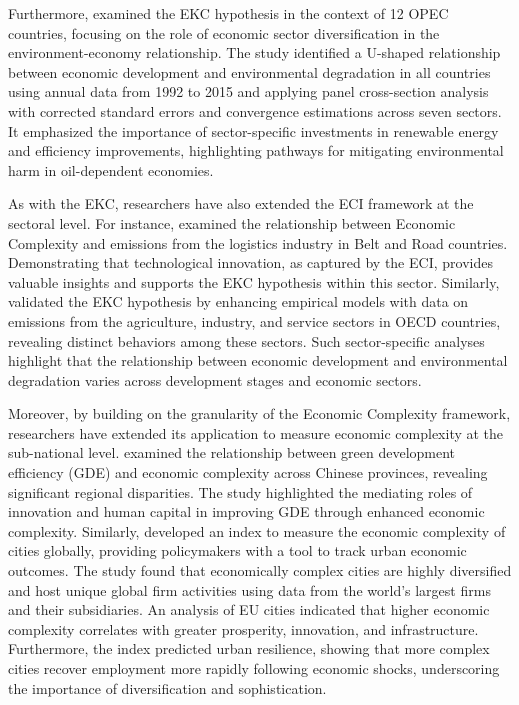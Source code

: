 \documentclass[10pt]{article}
\begin{document}
Furthermore, \cite{moutinhoDeterminantsEnvironmentalKuznets2020} examined the EKC hypothesis in the context of 12 OPEC countries, focusing on the role of economic sector diversification in the environment-economy relationship. The study identified a U-shaped relationship between economic development and environmental degradation in all countries using annual data from 1992 to 2015 and applying panel cross-section analysis with corrected standard errors and convergence estimations across seven sectors. It emphasized the importance of sector-specific investments in renewable energy and efficiency improvements, highlighting pathways for mitigating environmental harm in oil-dependent economies.

As with the EKC, researchers have also extended the ECI framework at the sectoral level. For instance, \cite{yeCanIncreasedEconomic2023} examined the relationship between Economic Complexity and emissions from the logistics industry in Belt and Road countries. Demonstrating that technological innovation, as captured by the ECI, provides valuable insights and supports the EKC hypothesis within this sector. Similarly, \cite{taghvaeeEconomicComplexityCO22022} validated the EKC hypothesis by enhancing empirical models with data on emissions from the agriculture, industry, and service sectors in OECD countries, revealing distinct behaviors among these sectors. Such sector-specific analyses highlight that the relationship between economic development and environmental degradation varies across development stages and economic sectors.

Moreover, by building on the granularity of the Economic Complexity framework, researchers have extended its application to measure economic complexity at the sub-national level. \cite{wangCanIncreasingEconomic2023} examined the relationship between green development efficiency (GDE) and economic complexity across Chinese provinces, revealing significant regional disparities. The study highlighted the mediating roles of innovation and human capital in improving GDE through enhanced economic complexity. Similarly, \cite{lapatinasEconomicComplexityCities2022} developed an index to measure the economic complexity of cities globally, providing policymakers with a tool to track urban economic outcomes. The study found that economically complex cities are highly diversified and host unique global firm activities using data from the world's largest firms and their subsidiaries. An analysis of EU cities indicated that higher economic complexity correlates with greater prosperity, innovation, and infrastructure. Furthermore, the index predicted urban resilience, showing that more complex cities recover employment more rapidly following economic shocks, underscoring the importance of diversification and sophistication.
\end{document}
